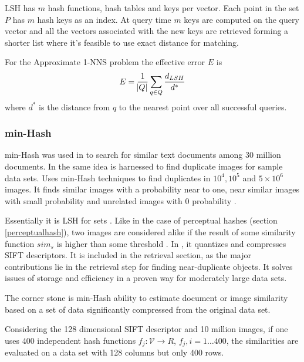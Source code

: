 \documentclass[english,12pt,a4paper,pdftex,elec,utf8, table]{aaltothesis}
\begin{document}
LSH has $m$ hash functions, hash tables and keys per vector. Each point in the set $P$ has $m$ hash keys as an index. At query time $m$ keys are computed on the query vector and all the vectors associated with the new keys are retrieved forming a shorter list where it's feasible to use exact distance for matching.





For the Approximate 1-NNS problem the effective error $E$ is
\begin{equation}
  \label{lsherroreq}
E = \frac{1}{\abs{Q}}\sum_{q\in Q}\frac{d_{LSH}}{d^*}
  \end{equation}
where $d^*$ is the distance from $q$ to the nearest point over all successful queries.

\subsubsection{min-Hash}
min-Hash was used in \cite{Broder1997} to search for similar text documents among 30 million documents. In \cite{Chum2008} the same idea is harnessed to find duplicate images for sample data sets. \cite{Chum2010} Uses min-Hash techniques to find duplicates in $10^4, 10^5$ and $5 \times 10^6$ images. It finds similar images with a probability near to one, near similar images with small probability and unrelated images with 0 probability \cite{Chum2010}.

Essentially it is LSH for sets \cite{Chum2010}. Like in the case of perceptual hashes (section \ref{perceptualhash}), two images are considered alike if the result of some similarity function $sim_s$ is higher than some threshold \cite{Chum2008}. In \cite{Chum2008}, it quantizes and compresses SIFT descriptors. It is included in the retrieval section, as the major contributions lie in the retrieval step for finding near-duplicate objects. It solves issues of storage and efficiency in a proven way for moderately large data sets.

The corner stone is min-Hash ability to estimate document or image similarity based on a set of data significantly compressed from the original data set.

Considering the 128 dimensional SIFT descriptor and 10 million images, if one uses 400 independent hash functions $f_j:\mathcal{V} \rightarrow R$, $f_j, i = 1 \ldots 400$, the similarities are evaluated on a data set with 128 columns but only 400 rows.
\end{document}
